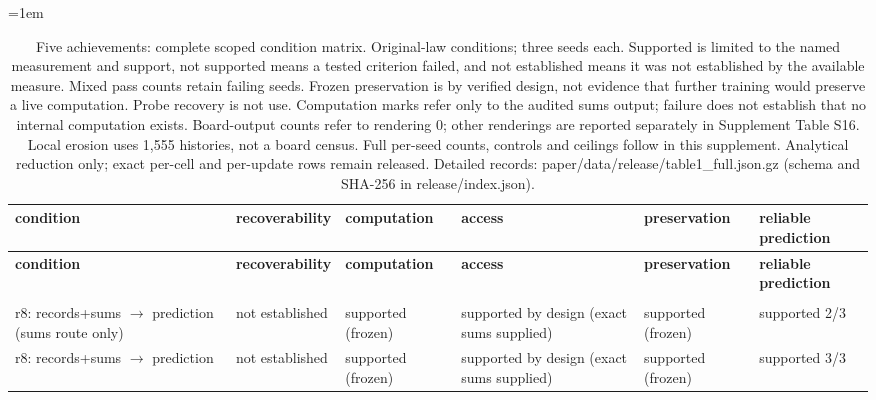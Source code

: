 \begingroup\fontsize{8}{9.5}\selectfont\setlength{\tabcolsep}{3pt}\emergencystretch=1em
\begin{longtable}{@{}>{\raggedright\arraybackslash}p{1.500in}>{\raggedright\arraybackslash}p{0.950in}>{\raggedright\arraybackslash}p{0.850in}>{\raggedright\arraybackslash}p{0.850in}>{\raggedright\arraybackslash}p{0.850in}>{\raggedright\arraybackslash}p{0.850in}@{}}
\caption{Five achievements: complete scoped condition matrix. Original-law conditions; three seeds each. Supported is limited to the named measurement and support, not supported means a tested criterion failed, and not established means it was not established by the available measure. Mixed pass counts retain failing seeds. Frozen preservation is by verified design, not evidence that further training would preserve a live computation. Probe recovery is not use. Computation marks refer only to the audited sums output; failure does not establish that no internal computation exists. Board-output counts refer to rendering 0; other renderings are reported separately in Supplement Table S16. Local erosion uses 1,555 histories, not a board census. Full per-seed counts, controls and ceilings follow in this supplement. Analytical reduction only; exact per-cell and per-update rows remain released. Detailed records: paper/\allowbreak{}data/\allowbreak{}release/\allowbreak{}table1\_\allowbreak{}full.json.gz (schema and SHA-256 in release/\allowbreak{}index.json).}\label{tab:table1_full}\\
\toprule
\textbf{condition} & \textbf{recoverability} & \textbf{computation} & \textbf{access} & \textbf{preservation} & \textbf{reliable prediction} \\
\midrule\endfirsthead
\toprule
\textbf{condition} & \textbf{recoverability} & \textbf{computation} & \textbf{access} & \textbf{preservation} & \textbf{reliable prediction} \\
\midrule\endhead
\midrule\multicolumn{6}{r}{Continued on next page}\\\endfoot
\bottomrule\endlastfoot
r8: records+sums $\to$ prediction (sums route only) & not established & supported (frozen) & supported by design (exact sums supplied) & supported (frozen) & supported 2/\allowbreak{}3 \\
r8: records+sums $\to$ prediction & not established & supported (frozen) & supported by design (exact sums supplied) & supported (frozen) & supported 3/\allowbreak{}3 \\

\end{longtable}
